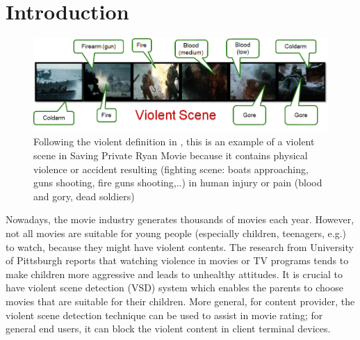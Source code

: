 \documentclass[twocolumn]{bmcart}%
\begin{document}




\section{Introduction}

\begin{figure}
	\centering
	\includegraphics[width=2\linewidth]{Images/ViolentScene.png}
	\caption{Following the violent definition in \cite{demarty2014benchmarking}, this is an example of a violent scene in Saving Private Ryan Movie because it contains physical violence or accident resulting (fighting scene: boats approaching, guns shooting, fire guns shooting,..) in human injury or pain (blood and gory, dead soldiers)}
	\label{fig:exampleVS}
\end{figure}

Nowadays, the movie industry generates thousands of movies each year. However, not all movies are suitable for young people (especially children, teenagers, e.g.) to watch, because they might have violent contents.   The research from University of Pittsburgh \cite{TVMovieViolence} reports that watching violence in movies or TV programs tends to make children more aggressive and leads to unhealthy attitudes. It is crucial to have violent scene detection (VSD) system which enables the parents to choose movies that are suitable for their children. More general, for content provider, the violent scene detection technique can be used to assist in movie rating; for general end users, it can block the violent content in client terminal devices. 
\end{document}
